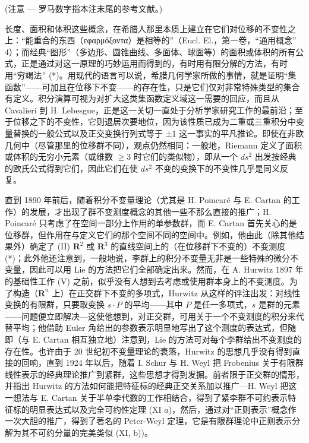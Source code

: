 (注意 --- 罗马数字指本注末尾的参考文献。)

长度、面积和体积这些概念，在希腊人那里本质上建立在它们对位移的不变性之上：“能重合的东西（εφαρμόξοντα）是相等的”（Eucl. El.，第一卷，“通用概念” 4）；而经典“图形”（多边形、圆锥曲线、多面体、球面等）的面积或体积的所有公式，正是通过对这一原理的巧妙运用而得到的，有时用有限分解的方法，有时用“穷竭法” (*)。用现代的语言可以说，希腊几何学家所做的事情，就是证明“集函数”——可加且在位移下不变——的存在性，只是它们仅对非常特殊类型的集合有定义。积分演算可视为对扩大这类集函数定义域这一需要的回应，而且从 Cavalieri 到 H. Lebesgue，正是这一关切一直处于分析学家研究工作的最前沿；至于位移之下的不变性，它则退居次要地位，因为该性质已成为二重或三重积分中变量替换的一般公式以及正交变换行列式等于 ±1 这一事实的平凡推论。即使在非欧几何中（尽管那里的位移群不同），观点仍然相同：一般地，Riemann 定义了面积或体积的无穷小元素（或维数 \(\geqslant3\) 时它们的类似物），即从一个 \(ds^{2}\) 出发按经典的欧氏公式得到它们，因此它们在使 \(ds^{2}\) 不变的变换下的不变性几乎是同义反复。

直到 1890 年前后，随着积分不变量理论（尤其是 H. Poincaré 与 E. Cartan 的工作）的发展，才出现了群不变测度概念的其他一些不那么直接的推广；H. Poincaré 只考虑了在空间一部分上作用的单参数群，而 E. Cartan 首先关心的是位移群，但作用在与定义它们的那个空间不同的空间中。例如，他由此（除其他结果外）确定了 (II) \(\mathbf{R}^2\) 或 \(\mathbf{R}^3\) 的直线空间上的（在位移群下不变的）不变测度 (*)；此外他还注意到，一般地说，李群上的积分不变量无非是一些特殊的微分不变量，因此可以用 Lie 的方法把它们全部确定出来。然而，在 A. Hurwitz 1897 年的基础性工作 (V) 之前，似乎没有人想到去考虑或使用群本身上的不变测度。为了构造（\(\mathbf{R}^n\) 上）在正交群下不变的多项式，Hurwitz 从这样的评注出发：对线性变换的有限群，只要取变换 \(s \cdot P\) 的平均——其中 \(P\) 是任一多项式，\(s\) 是群的元素——问题便立即解决---这使他想到，对正交群，可用关于一个不变测度的积分来代替平均；他借助 Euler 角给出的参数表示明显地写出了这个测度的表达式，但随即（与 E. Cartan 相互独立地）注意到，Lie 的方法可对每个李群给出不变测度的存在性。也许由于 20 世纪初不变量理论的衰落，Hurwitz 的思想几乎没有得到直接的回响，直到 1924 年以后，随着 I. Schur 与 H. Weyl 把 Frobenius 关于有限群线性表示的经典理论推广到紧群，这些思想才得到发掘。前者限于正交群的情形，并指出 Hurwitz 的方法如何能把特征标的经典正交关系加以推广---H. Weyl 把这一想法与 E. Cartan 关于半单李代数的工作相结合，得到了紧李群不可约表示特征标的明显表达式以及完全可约性定理 (XI \(a\))，然后，通过对“正则表示”概念作一次大胆的推广，得到了著名的 Peter-Weyl 定理，它是有限群理论中正则表示分解为其不可约分量的完美类似 (XI, b))。

